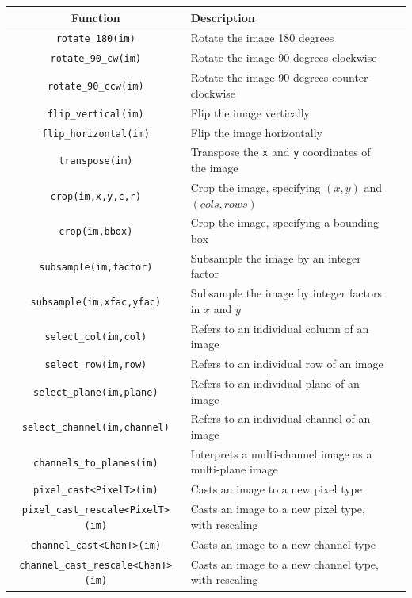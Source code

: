 \begin{table}[t]\begin{centering}
\begin{tabular}{|c|l|l|} \hline
Function & Description \\ \hline \hline
\verb#rotate_180(im)# & Rotate the image 180 degrees \\ \hline
\verb#rotate_90_cw(im)# & Rotate the image 90 degrees clockwise \\ \hline
\verb#rotate_90_ccw(im)# & Rotate the image 90 degrees counter-clockwise \\ \hline
\verb#flip_vertical(im)# & Flip the image vertically \\ \hline
\verb#flip_horizontal(im)# & Flip the image horizontally \\ \hline
\verb#transpose(im)# & Transpose the \verb#x# and \verb#y# coordinates of the image \\ \hline
\verb#crop(im,x,y,c,r)# & Crop the image, specifying $(x,y)$ and $(cols,rows)$ \\ \hline
\verb#crop(im,bbox)# & Crop the image, specifying a bounding box \\ \hline
\verb#subsample(im,factor)# & Subsample the image by an integer factor \\ \hline
\verb#subsample(im,xfac,yfac)# & Subsample the image by integer factors in $x$ and $y$ \\ \hline
\verb#select_col(im,col)# & Refers to an individual column of an image \\ \hline
\verb#select_row(im,row)# & Refers to an individual row of an image \\ \hline
\verb#select_plane(im,plane)# & Refers to an individual plane of an image \\ \hline
\verb#select_channel(im,channel)# & Refers to an individual channel of an image \\ \hline
\verb#channels_to_planes(im)# & Interprets a multi-channel image as a multi-plane image \\ \hline
\hline
\verb#pixel_cast<PixelT>(im)# & Casts an image to a new pixel type \\ \hline
\verb#pixel_cast_rescale<PixelT>(im)# & Casts an image to a new pixel type, with rescaling \\ \hline
\verb#channel_cast<ChanT>(im)# & Casts an image to a new channel type \\ \hline
\verb#channel_cast_rescale<ChanT>(im)# & Casts an image to a new channel type, with rescaling \\ \hline

\end{tabular}
\end{centering}
\end{table}
